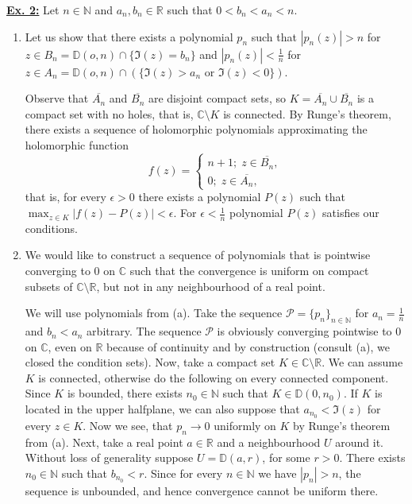 \documentclass[a4paper, 12pt]{article} %
\newcommand{\D}{\mathbb{D}}
\newcommand{\N}{\mathbb{N}}
\newcommand{\R}{\mathbb{R}}
\newcommand{\C}{\mathbb{C}}
\newcommand{\closure}[1]{\overline{#1}}
\begin{document}
\underline{\textbf{Ex. 2:}}
Let $n \in \N$ and $a_n, b_n \in \R$ such that $0 < b_n < a_n < n$.

\begin{enumerate}[label=(\alph*)]
	\item Let us show that there exists a polynomial $p_n$ such that $|p_n(z)| > n$ for $z \in B_n = \D(o, n) \cap \lbrace\Im(z) = b_n\rbrace$ and $|p_n(z)| < \frac{1}{n}$ for $z \in A_n = \D(o, n) \cap (\lbrace\Im(z) > a_n \text{ or } \Im(z) < 0 \rbrace)$.
	
	Observe that $\closure{A_n}$ and $\closure{B_n}$ are disjoint compact sets, so $K = \closure{A_n} \cup \closure{B_n}$ is a compact set with no holes, that is, $\C\setminus K$ is connected. By Runge's theorem, there exists a sequence of holomorphic polynomials approximating the holomorphic function
	\[
	f(z) = \begin{cases}
	n+1 ; \; z \in \closure{B_n}, \\
	0 ; \; z \in \closure{A_n},
	\end{cases}
	\]
	that is, for every $\epsilon > 0$ there exists a polynomial $P(z)$ such that $\max_{z \in K}|f(z)-P(z)| < \epsilon$. For $\epsilon < \frac{1}{n}$ polynomial $P(z)$ satisfies our conditions.
	
	\item We would like to construct a sequence of polynomials that is pointwise converging to $0$ on $\C$ such that the convergence is uniform on compact subsets of $\C \setminus \R$, but not in any neighbourhood of a real point.
	
	We will use polynomials from (a). Take the sequence $\mathcal{P} = \lbrace p_{n}\rbrace_{n \in \N}$ for $a_{n} = \frac{1}{n}$ and $b_n < a_n$ arbitrary. The sequence $\mathcal{P}$ is obviously converging pointwise to $0$ on $\C$, even on $\R$ because of continuity and by construction (consult (a), we closed the condition sets). Now, take a compact set $K \in \C\setminus\R$. We can assume $K$ is connected, otherwise do the following on every connected component. Since $K$ is bounded, there exists $n_0 \in \N$ such that $K \in \D(0, n_0)$.
	If $K$ is located in the upper halfplane, we can also suppose that $a_{n_0} < \Im(z)$ for every $z \in K$. Now we see, that $p_{n} \to 0$ uniformly on $K$ by Runge's theorem from (a).
	Next, take a real point $a \in \R$ and a neighbourhood $U$ around it. Without loss of generality suppose $U = \D(a, r)$, for some $r > 0$. There exists $n_0 \in \N$ such that $b_{n_0} < r$. Since for every $n \in \N$ we have $|p_{n}| > n$, the sequence is unbounded, and hence convergence cannot be uniform there.
	

\end{enumerate}
\end{document}
